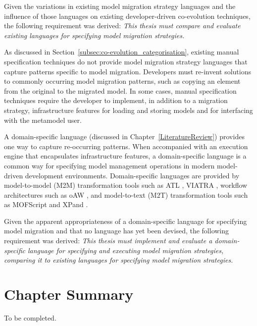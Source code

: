 Given the variations in existing model migration strategy languages and the influence of those languages on existing developer-driven co-evolution techniques, the following requirement was derived: \emph{This thesis must compare and evaluate existing languages for specifying model migration strategies.}

As discussed in Section~\ref{subsec:co-evolution_categorisation}, existing manual specification techniques do not provide model migration strategy languages that capture patterns specific to model migration. Developers must re-invent solutions to commonly occurring model migration patterns, such as copying an element from the original to the migrated model. In some cases, manual specification techniques require the developer to implement, in addition to a migration strategy, infrastructure features for loading and storing models and for interfacing with the metamodel user. 

A domain-specific language (discussed in Chapter~\ref{LiteratureReview}) provides one way to capture re-occurring patterns. When accompanied with an execution engine that encapsulates infrastructure features, a domain-specific language is a common way for specifying model management operations in modern model-driven development environments. Domain-specific languages are provided by model-to-model (M2M) transformation tools such as ATL \cite{atl}, VIATRA \cite{VIATRA}, workflow architectures such as oAW \cite{oaw}, and model-to-text (M2T) transformation tools such as MOFScript \cite{oldevik05toward} and XPand \cite{oaw}.

Given the apparent appropriateness of a domain-specific language for specifying model migration and that no language has yet been devised, the following requirement was derived: \emph{This thesis must implement and evaluate a domain-specific language for specifying and executing model migration strategies, comparing it to existing languages for specifying model migration strategies.}


\section{Chapter Summary}
To be completed.
